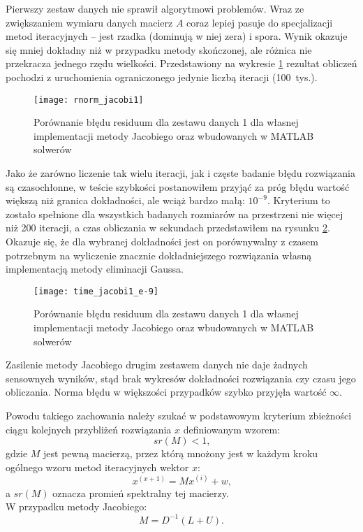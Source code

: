 \documentclass[12pt]{article}
\begin{document}
Pierwszy zestaw danych nie sprawił algorytmowi problemów. Wraz ze zwiększaniem wymiaru danych macierz \(A\) coraz lepiej pasuje do specjalizacji metod iteracyjnych -- jest rzadka (dominują w niej zera) i spora. Wynik okazuje się mniej dokładny niż w przypadku metody skończonej, ale różnica nie przekracza jednego rzędu wielkości. Przedstawiony na wykresie \ref{fig:rnorm_jacobi1} rezultat obliczeń pochodzi z uruchomienia ograniczonego jedynie liczbą iteracji (100~tys.).

\begin{figure}[!htbp]
\centering
\texttt{[image: rnorm\_jacobi1]}
\centering
\caption{Porównanie błędu residuum dla zestawu danych 1 dla własnej implementacji metody Jacobiego oraz wbudowanych w MATLAB solwerów}
\label{fig:rnorm_jacobi1}
\end{figure}
\FloatBarrier

Jako że zarówno liczenie tak wielu iteracji, jak i częste badanie błędu rozwiązania są czasochłonne, w teście szybkości postanowiłem przyjąć za próg błędu wartość większą niż granica dokładności, ale wciąż bardzo małą: \(10^{-9}\). Kryterium to zostało spełnione dla wszystkich badanych rozmiarów na przestrzeni nie więcej niż 200 iteracji, a czas obliczania w sekundach przedstawiłem na rysunku \ref{fig:time_jacobi1_e-9}. Okazuje się, że dla wybranej dokładności jest on porównywalny z czasem potrzebnym na wyliczenie znacznie dokładniejszego rozwiązania własną implementacją metody eliminacji Gaussa.

\begin{figure}[!htbp]
\centering
\texttt{[image: time\_jacobi1\_e-9]}
\centering
\caption{Porównanie błędu residuum dla zestawu danych 1 dla własnej implementacji metody Jacobiego oraz wbudowanych w MATLAB solwerów}
\label{fig:time_jacobi1_e-9}
\end{figure}
\FloatBarrier

Zasilenie metody Jacobiego drugim zestawem danych nie daje żadnych sensownych wyników, stąd brak wykresów dokładności rozwiązania czy czasu jego obliczania. Norma błędu w większości przypadków szybko przyjęła wartość \(\infty\).

Powodu takiego zachowania należy szukać w podstawowym kryterium zbieżności ciągu kolejnych przybliżeń rozwiązania \(x\) definiowanym wzorem:
\[ sr(M)<1 \text{,} \]
gdzie \(M\) jest pewną macierzą, przez którą mnożony jest w każdym kroku ogólnego wzoru metod iteracyjnych wektor \(x\):
\[ x^{(x+1)} = Mx^{(i)} + w \text{,} \]
a \(sr(M)\) oznacza promień spektralny tej macierzy. \\
W przypadku metody Jacobiego:
\[ M = D^{-1}(L + U) \text{.} \]
\end{document}
